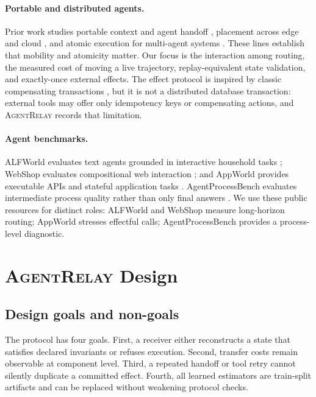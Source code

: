 \documentclass[10pt]{article}
\newcommand{\system}{\textsc{AgentRelay}}
\begin{document}
\paragraph{Portable and distributed agents.}
Prior work studies portable context and agent handoff
\citep{ravindran2026portable,kc2026handoff}, placement across edge and cloud
\citep{wang2025placement}, and atomic execution for multi-agent systems
\citep{mohammadi2026atomix}. These lines establish that mobility and atomicity
matter. Our focus is the interaction among routing, the measured cost of
moving a live trajectory, replay-equivalent state validation, and
exactly-once external effects. The effect protocol is inspired by classic
compensating transactions \citep{garciamolina1987sagas}, but it is not a
distributed database transaction: external tools may offer only idempotency
keys or compensating actions, and \system{} records that limitation.

\paragraph{Agent benchmarks.}
ALFWorld evaluates text agents grounded in interactive household tasks
\citep{shridhar2021alfworld}; WebShop evaluates compositional web interaction
\citep{yao2022webshop}; and AppWorld provides executable APIs and stateful
application tasks \citep{trivedi2024appworld}. AgentProcessBench evaluates
intermediate process quality rather than only final answers
\citep{fan2026agentprocessbench}. We use these public resources for distinct
roles: ALFWorld and WebShop measure long-horizon routing; AppWorld stresses
effectful calls; AgentProcessBench provides a process-level diagnostic.

\section{\system{} Design}
\label{sec:design}

\subsection{Design goals and non-goals}

The protocol has four goals. First, a receiver either reconstructs a state
that satisfies declared invariants or refuses execution. Second, transfer
costs remain observable at component level. Third, a repeated handoff or tool
retry cannot silently duplicate a committed effect. Fourth, all learned
estimators are train-split artifacts and can be replaced without weakening
protocol checks.
\end{document}
